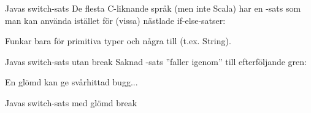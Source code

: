\begin{Slide}{Javas switch-sats}\SlideFontSmall
De flesta C-liknande språk (men inte Scala) har en -sats som man kan använda istället för (vissa) nästlade if-else-satser: 

\vspace{-0.5em}Funkar bara för primitiva typer och några till (t.ex. String).
\end{Slide}

\ifkompendium\else
\begin{Slide}{Javas switch-sats utan break}\SlideFontSmall
Saknad -sats ''faller igenom'' till efterföljande gren: 

En glömd  kan ge svårhittad bugg... 
\end{Slide}

\begin{Slide}{Javas switch-sats med glömd break}\SlideFontSmall

\vspace{-0.5em}

\vspace{-0.7em}\pause
{}

\end{Slide}


